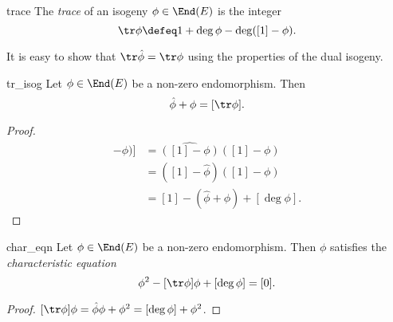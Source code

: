 \begin{dfn}{}{trace}
The \emph{trace} of an isogeny $\phi \in \End(E)$ is the integer
\[
\tr\phi \defeq 1 + \deg \phi - \deg([1] - \phi).
\]
\end{dfn}

It is easy to show that $\tr \hat{\phi} = \tr \phi$ using the properties of the dual isogeny.

\begin{lem}{}{tr_isog}
Let $\phi \in \End(E)$ be a non-zero endomorphism. Then
\[
\hat{\phi} + \phi = [\tr \phi].
\]
\end{lem}
\begin{proof}
\begin{align*}
[\deg([1] - \phi)] &= \widehat{([1] - \phi)}([1] - \phi) \\
&= ([1] - \hat{\phi}) ([1] - \phi) \\
&= [1] - (\hat{\phi} + \phi) + [\deg \phi].
\end{align*}
\end{proof}

\begin{thm}{}{char_eqn}
Let $\phi \in \End(E)$ be a non-zero endomorphism. Then $\phi$ satisfies the \emph{characteristic equation}
\[
\phi^2 - [\tr \phi] \phi + [\deg \phi] = [0].
\]
\end{thm}
\begin{proof}
$[\tr \phi] \phi = \hat{\phi} \phi + \phi^2 = [\deg \phi] + \phi^2$.
\end{proof}
